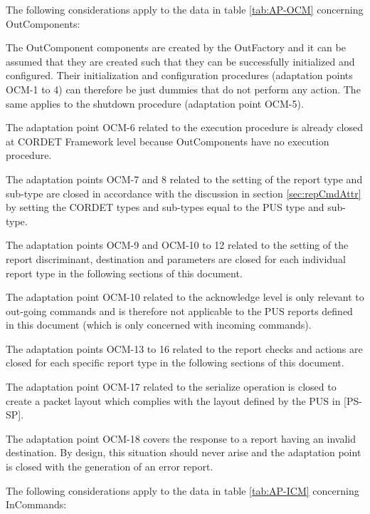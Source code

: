 \documentclass{pnp_article}
\begin{document}
The following considerations apply to the data in table \ref{tab:AP-OCM} concerning OutComponents:

\begin{fw_itemize}
\item The OutComponent components are created by the OutFactory and it can be assumed that they are created such that they can be successfully initialized and configured. Their initialization and configuration procedures (adaptation points OCM-1 to 4) can therefore be just dummies that do not perform any action. The same applies to the shutdown procedure (adaptation point OCM-5).
\item The adaptation point OCM-6 related to the execution procedure is already closed at CORDET Framework level because OutComponents have no execution procedure.
\item The adaptation points OCM-7 and 8 related to the setting of the report type and sub-type are closed in accordance with the discussion in section \ref{sec:repCmdAttr} by setting the CORDET types and sub-types equal to the PUS type and sub-type.
\item The adaptation points OCM-9 and OCM-10 to 12 related to the setting of the report discriminant, destination and parameters are closed for each individual report type in the following sections of this document.
\item The adaptation point OCM-10 related to the acknowledge level is only relevant to out-going commands and is therefore not applicable to the PUS reports defined in this document (which is only concerned with incoming commands).
\item The adaptation points OCM-13 to 16 related to the report checks and actions are closed for each specific report type in the following sections of this document.
\item The adaptation point OCM-17 related to the serialize operation is closed to create a packet layout which complies with the layout defined by the PUS in [PS-SP].
\item The adaptation point OCM-18 covers the response to a report having an invalid destination. By design, this situation should never arise and the adaptation point is closed with the generation of an error report.
\end{fw_itemize}

The following considerations apply to the data in table \ref{tab:AP-ICM} concerning InCommands:
\end{document}
